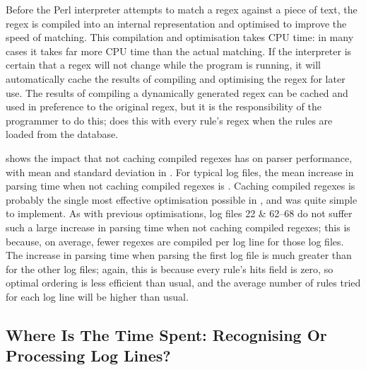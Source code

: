 \label{Caching compiled regexes}

Before the Perl interpreter attempts to match a regex against a piece of
text, the regex is compiled into an internal representation and optimised
to improve the speed of matching.  This compilation and optimisation takes
CPU time: in many cases it takes far more CPU time than the actual
matching.  If the interpreter is certain that a regex will not change while
the program is running, it will automatically cache the results of
compiling and optimising the regex for later use.  The results of compiling
a dynamically generated regex can be cached and used in preference to the
original regex, but it is the responsibility of the programmer to do this;
\parsername{} does this with every rule's regex when the rules are loaded
from the database.

shows the impact that not caching compiled regexes has on parser
performance, with mean and standard deviation in .  For typical log
files, the mean increase in parsing time when not caching compiled regexes
is .  Caching
compiled regexes is probably the single most effective optimisation
possible in \parsername{}, and was quite simple to implement.  As with
previous optimisations, log files 22 \& 62--68 do not suffer such a large
increase in parsing time when not caching compiled regexes; this is
because, on average, fewer regexes are compiled per log line for those log
files.  The increase in parsing time when parsing the first log file is
much greater than for the other log files; again, this is because every
rule's hits field is zero, so optimal ordering is less efficient than
usual, and the average number of rules tried for each log line will be
higher than usual.



\FloatBarrier{}

\subsection{Where Is The Time Spent: Recognising Or Processing Log Lines?}

